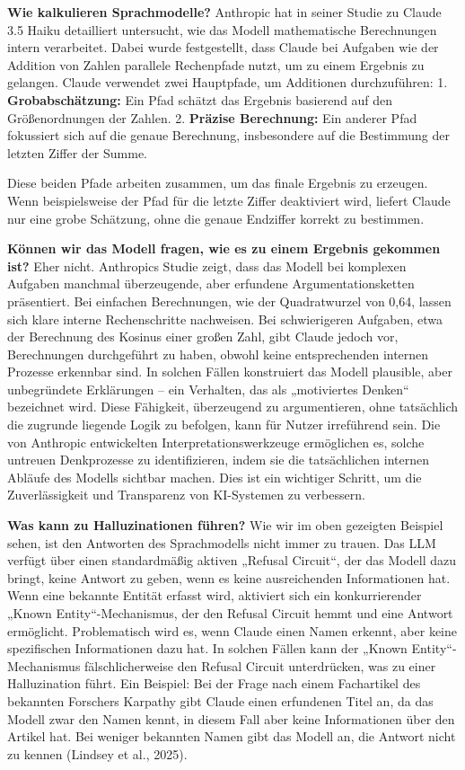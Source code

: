 \documentclass[
  ngerman,
  letterpaper,
  DIV=11]{scrreprt}
\begin{document}
\textbf{Wie kalkulieren Sprachmodelle?} Anthropic hat in seiner Studie
zu Claude 3.5 Haiku detailliert untersucht, wie das Modell mathematische
Berechnungen intern verarbeitet. Dabei wurde festgestellt, dass Claude
bei Aufgaben wie der Addition von Zahlen parallele Rechenpfade nutzt, um
zu einem Ergebnis zu gelangen.\hspace{0pt} Claude verwendet zwei
Hauptpfade, um Additionen durchzuführen: 1. \textbf{Grobabschätzung:}
Ein Pfad schätzt das Ergebnis basierend auf den Größenordnungen der
Zahlen. 2. \textbf{Präzise Berechnung:} Ein anderer Pfad fokussiert sich
auf die genaue Berechnung, insbesondere auf die Bestimmung der letzten
Ziffer der Summe.

Diese beiden Pfade arbeiten zusammen, um das finale Ergebnis zu
erzeugen. Wenn beispielsweise der Pfad für die letzte Ziffer deaktiviert
wird, liefert Claude nur eine grobe Schätzung, ohne die genaue Endziffer
korrekt zu bestimmen.

\textbf{Können wir das Modell fragen, wie es zu einem Ergebnis gekommen
ist?} Eher nicht. Anthropics Studie zeigt, dass das Modell bei komplexen
Aufgaben manchmal überzeugende, aber erfundene Argumentationsketten
präsentiert. Bei einfachen Berechnungen, wie der Quadratwurzel von 0,64,
lassen sich klare interne Rechenschritte nachweisen. Bei schwierigeren
Aufgaben, etwa der Berechnung des Kosinus einer großen Zahl, gibt Claude
jedoch vor, Berechnungen durchgeführt zu haben, obwohl keine
entsprechenden internen Prozesse erkennbar sind. In solchen Fällen
konstruiert das Modell plausible, aber unbegründete Erklärungen -- ein
Verhalten, das als „motiviertes Denken`` bezeichnet wird. Diese
Fähigkeit, überzeugend zu argumentieren, ohne tatsächlich die zugrunde
liegende Logik zu befolgen, kann für Nutzer irreführend sein. Die von
Anthropic entwickelten Interpretationswerkzeuge ermöglichen es, solche
untreuen Denkprozesse zu identifizieren, indem sie die tatsächlichen
internen Abläufe des Modells sichtbar machen. Dies ist ein wichtiger
Schritt, um die Zuverlässigkeit und Transparenz von KI-Systemen zu
verbessern.

\textbf{Was kann zu Halluzinationen führen?} Wie wir im oben gezeigten
Beispiel sehen, ist den Antworten des Sprachmodells nicht immer zu
trauen. Das LLM verfügt über einen standardmäßig aktiven „Refusal
Circuit``, der das Modell dazu bringt, keine Antwort zu geben, wenn es
keine ausreichenden Informationen hat. Wenn eine bekannte Entität
erfasst wird, aktiviert sich ein konkurrierender „Known
Entity``-Mechanismus, der den Refusal Circuit hemmt und eine Antwort
ermöglicht. Problematisch wird es, wenn Claude einen Namen erkennt, aber
keine spezifischen Informationen dazu hat. In solchen Fällen kann der
„Known Entity``-Mechanismus fälschlicherweise den Refusal Circuit
unterdrücken, was zu einer Halluzination führt. Ein Beispiel: Bei der
Frage nach einem Fachartikel des bekannten Forschers Karpathy gibt
Claude einen erfundenen Titel an, da das Modell zwar den Namen kennt, in
diesem Fall aber keine Informationen über den Artikel hat. Bei weniger
bekannten Namen gibt das Modell an, die Antwort nicht zu kennen (Lindsey
et al., 2025).
\end{document}
